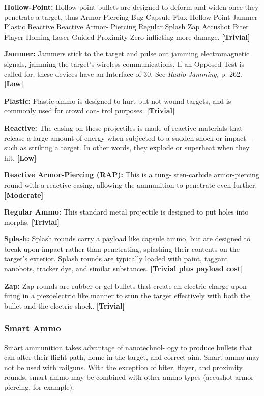 \textbf{Hollow-Point:} Hollow-point bullets are designed to 
deform and widen once they penetrate a target, thus 
Armor-Piercing
Bug
Capsule
Flux
Hollow-Point
Jammer
Plastic
Reactive
Reactive Armor-
Piercing
Regular
Splash
Zap
Accushot
Biter
Flayer
Homing
Laser-Guided
Proximity
Zero
inflicting more damage. \textbf{[Trivial]}

\textbf{Jammer:} Jammers stick to the target and pulse out 
jamming electromagnetic signals, jamming the target's 
wireless communications. If an Opposed Test is called 
for, these devices have an Interface of 30. See \textit{Radio }
\textit{Jamming,} p. 262. \textbf{[Low]}

\textbf{Plastic: }Plastic ammo is designed to hurt but not 
wound targets, and is commonly used for crowd con-
trol purposes. \textbf{[Trivial]}

\textbf{Reactive: }The casing on these projectiles is made 
of reactive materials that release a large amount of 
energy when subjected to a sudden shock or impact—
such as striking a target. In other words, they explode 
or superheat when they hit. \textbf{[Low]}

\textbf{Reactive Armor-Piercing (RAP):} This is a tung-
sten-carbide armor-piercing round with a reactive 
casing, allowing the ammunition to penetrate even 
further. \textbf{[Moderate]}

\textbf{Regular Ammo: }This standard metal projectile is 
designed to put holes into morphs. \textbf{[Trivial]}

\textbf{Splash: }Splash rounds carry a payload like capsule 
ammo, but are designed to break upon impact rather 
than penetrating, splashing their contents on the 
target's exterior. Splash rounds are typically loaded 
with paint, taggant nanobots, tracker dye, and similar 
substances. \textbf{[Trivial plus payload cost]}

\textbf{Zap:} Zap rounds are rubber or gel bullets that 
create an electric charge upon firing in a piezoelectric 
like manner to stun the target effectively with both 
the bullet and the electric shock. \textbf{[Trivial]}

\subsubsection{Smart Ammo}

Smart ammunition takes advantage of nanotechnol-
ogy to produce bullets that can alter their flight path, 
home in the target, and correct aim. Smart ammo may 
not be used with railguns. With the exception of biter, 
flayer, and proximity rounds, smart ammo may be 
combined with other ammo types (accushot armor-
piercing, for example).

